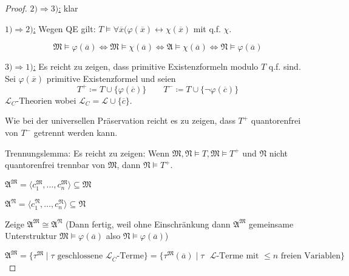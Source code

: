 \documentclass[12pt,parskip=full]{scrartcl}
\newcommand{\heading}{\underline}
\theoremstyle{definition}
\begin{document}
	\begin{proof}
		\heading{$2) \Rightarrow 3)$:} klar
		
		\heading{$1) \Rightarrow 2)$:} Wegen QE gilt: $T \models \forall \overline{x}(\varphi(\overline{x}) \leftrightarrow \chi(\overline{x})$ mit q.f. $\chi$.
		
		\begin{equation*}
			\mathfrak{M} \models \varphi(\overline{a}) \Leftrightarrow \mathfrak{M} \models \chi(\overline{a}) \Leftrightarrow \mathfrak{A} \models \chi(\overline{a}) \Leftrightarrow \mathfrak{N} \models \varphi(\overline{a})
		\end{equation*}
		
		\heading{$3) \Rightarrow 1)$:} Es reicht zu zeigen, dass primitive Existenzformeln modulo $T$ q.f. sind. Sei $\varphi(\overline{x})$ primitive Existenzformel und seien
		\begin{equation*}
			T^+ \coloneqq T \cup \{ \varphi(\overline{c}) \} \qquad T^- \coloneqq T \cup \{ \lnot \varphi(\overline{c}) \}
		\end{equation*} $\mathcal{L}_C$-Theorien wobei $\mathcal{L}_C = \mathcal{L} \cup \{ \overline{c} \}$.
		
		Wie bei der universellen Präservation reicht es zu zeigen, dass $T^+$ quantorenfrei von $T^-$ getrennt werden kann.
		
		Trennungslemma: Es reicht zu zeigen: Wenn $\mathfrak{M}, \mathfrak{N} \models T, \mathfrak{M} \models T^+$ und $\mathfrak{N}$ nicht quantorenfrei trennbar von $\mathfrak{M}$, dann $\mathfrak{N} \models T^+$.
		
		$\mathfrak{A}^\mathfrak{M} = \langle c_1^\mathfrak{M}, \dots, c_n^\mathfrak{M} \rangle \subseteq \mathfrak{M}$
		
		$\mathfrak{A}^\mathfrak{N} = \langle c_1^\mathfrak{N}, \dots, c_n^\mathfrak{N} \rangle \subseteq \mathfrak{N}$
		
		Zeige $\mathfrak{A}^\mathfrak{M} \cong \mathfrak{A}^\mathfrak{N}$ (Dann fertig, weil ohne Einschränkung dann $\mathfrak{A}^\mathfrak{M}$ gemeinsame Unterstruktur $\mathfrak{M} \models \varphi(\overline{a})$ also $\mathfrak{N} \models \varphi(\overline{a})$)
		
		\begin{equation*}
			\mathfrak{A}^\mathfrak{M} = \{ \tau^\mathfrak{M} \mid \text{$\tau$ geschlossene $\mathcal{L}_{\overline{C}}$-Terme} \} = \{ \tau^\mathfrak{M}(\overline{a}) \mid \text{$\tau$ $\mathcal{L}$-Terme mit $\leq n$ freien Variablen} \}
		\end{equation*}
		

\end{proof}
\end{document}
